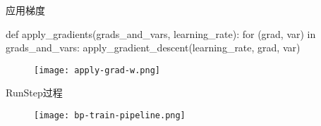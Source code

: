 \begin{frame}[fragile]{应用梯度}
  \begin{python} 
def apply_gradients(grads_and_vars, learning_rate):
  for (grad, var) in grads_and_vars:
    apply_gradient_descent(learning_rate, grad, var)
  \end{python}
  \begin{figure}
    \centering
    \texttt{[image: apply-grad-w.png]}
  \end{figure}  
\end{frame}

\begin{frame}{RunStep过程}
  \begin{figure}
    \centering
    \texttt{[image: bp-train-pipeline.png]}
  \end{figure}
\end{frame}
